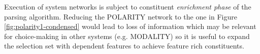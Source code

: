 Execution of system networks is subject to constituent \textit{enrichment phase} of the parsing algorithm. Reducing the POLARITY network to the one in Figure \ref{fig:polarity1-condensed} would lead to loss of information which may be relevant for choice-making in other systems (e.g. MODALITY) so it is useful to expand the selection set with dependent features to achieve feature rich constituents.
